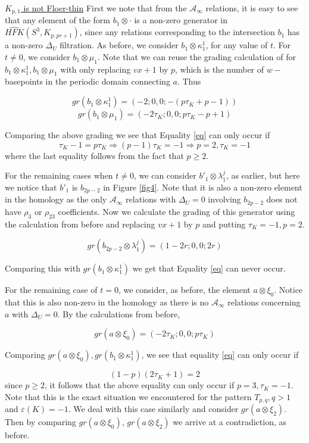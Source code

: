 \documentclass[11pt,reqno]{amsart}
\theoremstyle{definition}
\newtheorem *{remark}{Remark}
\newcommand{\hfkhat}{\widehat{\mathit{HFK}}}
\begin{document}
\begin{subsection}{\underline{$K_{p,1}$ is not Floer-thin}}
First we note that from the $\mathcal{A}_{\infty}$ relations, it is easy to see that any element of the form $b_1\otimes \cdot$ is a non-zero generator in $\hfkhat(S^3, K_{p,pr+1})$, since any relations corresponding to the intersection $b_1$ has a non-zero $\Delta_U$ filtration. As before, we consider $b_1 \otimes \kappa^1_1$, for any value of $t$. For $t \neq 0$, we consider $b_1 \otimes \mu_1$. Note that we can reuse the grading calculation of for $b_1 \otimes \kappa^1_1, b_1 \otimes \mu_1$ with only replacing $vx+1$ by $p$, which is the number of $w-$basepoints in the periodic domain connecting $a$. Thus

\[gr(b_1 \otimes \kappa^1_1) = (-2;0,0;-(p\tau_K+p-1))\]
\[gr(b_1 \otimes \mu_1)= (-2\tau_K;0,0; p\tau_K-p+1)\]

Comparing the above grading we see that Equality \ref{eq} can only occur if 
\[\tau_K-1 = p\tau_K \Rightarrow (p-1)\tau_K=-1 \Rightarrow p=2, \tau_K=-1\]
where the last equality follows from the fact that $p \geq 2$.

For the remaining cases when $t \neq 0$, we can consider $b'_1 \otimes \lambda^j_{1}$, as earlier, but here we notice that $b'_1$ is $b_{2p-2}$ in Figure \ref{fig4}. Note that it is also a non-zero element in the homology as the only $\mathcal{A}_{\infty}$ relations with $\Delta_U=0$ involving $b_{2p-2}$ does not have $\rho_3$ or $\rho_{23}$ coefficients. Now we calculate the grading of this generator using the calculation from before and replacing $vx+1$ by $p$ and putting $\tau_K=-1, p=2$. 

\[gr(b_{2p-2}\otimes \lambda^j_1) = (1-2r;0,0;2r)\]

Comparing this with $gr(b_1 \otimes \kappa^1_1)$ we get that Equality \ref{eq} can never occur. 

For the remaining case of $t=0$, we consider, as before, the element $a\otimes \xi_0$. Notice that this is also non-zero in the homology as there is no $\mathcal{A}_{\infty}$ relations concerning $a$ with $\Delta_U=0$. By the calculations from before,

\[gr(a\otimes \xi_0) = (-2\tau_K;0,0;p\tau_K)\]

Comparing $gr(a\otimes \xi_0), gr(b_1 \otimes \kappa^1_1)$, we see that equality \ref{eq} can only occur if 

\[(1-p)(2\tau_K+1) = 2\] since $p \geq 2$, it follows that the above equality can only occur if $p=3, \tau_K=-1$. Note that this is the exact situation we encountered for the pattern $T_{p,q}, q>1$ and $\varepsilon(K) = -1$. We deal with this case similarly and consider $gr(a\otimes \xi_2)$. Then by comparing $gr(a\otimes \xi_0)$, $gr(a\otimes \xi_2)$ we arrive at a contradiction, as before.


\end{subsection}
\end{document}
